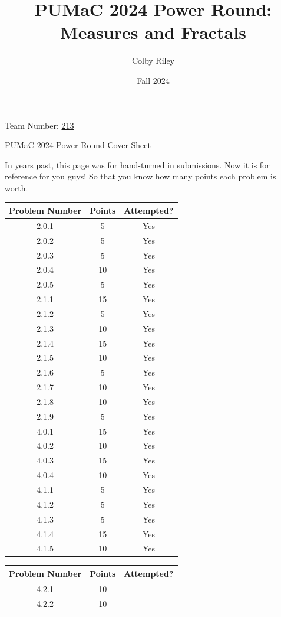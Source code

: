 \documentclass[11pt]{article}
\title{PUMaC 2024 Power Round: \\ Measures and Fractals}
\author{Colby Riley}
\date{Fall 2024}
\theoremstyle{definition}
\theoremstyle{remark}
\theoremstyle{problem}
\begin{document}
\thispagestyle{empty}
\noindent \huge{Team Number:} \underline{213\phantom{}}

\vspace{.5cm}
\noindent \huge{PUMaC 2024 Power Round Cover Sheet}

\vspace{.5cm}
\normalsize
In years past, this page was for hand-turned in submissions. Now it is for reference for you guys! So that you know how many points each problem is worth. 

\begin{center}
\begin{tabular}{|c|c|c|}\hline
Problem Number & Points & Attempted?\\\hline
2.0.1 & 5 & Yes \\\hline
2.0.2 & 5 & Yes \\\hline
2.0.3 & 5 & Yes \\\hline
2.0.4 & 10 & Yes \\\hline
2.0.5 & 5 & Yes \\\hline
2.1.1 & 15 & Yes \\\hline
2.1.2 & 5 & Yes \\\hline
2.1.3 & 10 & Yes \\\hline
2.1.4 & 15 & Yes \\\hline
2.1.5 & 10 & Yes \\\hline
2.1.6 & 5 & Yes \\\hline
2.1.7 & 10 & Yes \\\hline
2.1.8 & 10 & Yes \\\hline
2.1.9 & 5 & Yes \\\hline
4.0.1 & 15 & Yes \\\hline
4.0.2 & 10 & Yes \\\hline
4.0.3 & 15 & Yes \\\hline
4.0.4 & 10 & Yes \\\hline
4.1.1 & 5 & Yes \\\hline
4.1.2 & 5 & Yes \\\hline
4.1.3 & 5 & Yes \\\hline
4.1.4 & 15 & Yes \\\hline
4.1.5 & 10 & Yes \\\hline
\end{tabular}
\hspace{0.5 cm}
\begin{tabular}{|c|c|c|}\hline
Problem Number & Points & Attempted?\\\hline
4.2.1 & 10 & \\\hline
4.2.2 & 10 & \\\hline

\end{tabular}
\end{center}
\end{document}
